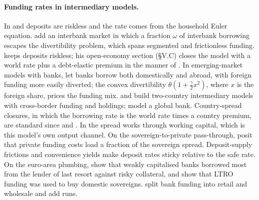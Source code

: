 \documentclass[11pt]{article}
\begin{document}
\paragraph{Funding rates in intermediary models.} In \citet{gertler2011model} and
\citet{gertler2010financial} deposits are riskless and the rate comes from the household Euler
equation. \citet{gertler2010financial} add an interbank market in which a fraction $\omega$ of
interbank borrowing escapes the divertibility problem, which spans segmented and frictionless
funding. \citet{bocola2016} keeps deposits riskless; his open-economy section (§V.C) closes the
model with a world rate plus a debt-elastic premium in the manner of
\citet{schmittgrohe2003closing}. In emerging-market models with banks,
\citet{aoki2016monetary} let banks borrow both domestically and abroad, with foreign funding more
easily diverted; the convex divertibility $\theta(1+\tfrac{\gamma}{2}x^2)$, where $x$ is the
foreign share, prices the funding mix. \citet{akinci2018exchange} and
\citet{dedola2013global} build two-country intermediary models with cross-border funding and
holdings; \citet{kollmann2011global} model a global bank. Country-spread closures, in which the
borrowing rate is the world rate times a country premium, are standard since
\citet{neumeyer2005business} and \citet{uribe2006country}. In \citet{neumeyer2005business} the
spread works through working capital, which is this model's own output channel. On the
sovereign-to-private pass-through, \citet{corsetti2013sovereign} posit that private funding
costs load a fraction of the sovereign spread. Deposit-supply frictions and convenience yields
\citep{drechsler2017deposits,begenau2020capital} make deposit rates sticky relative to the
safe rate. On the euro-area plumbing, \citet{drechsler2016who} show that weakly capitalised
banks borrowed most from the lender of last resort against risky collateral, and
\citet{crosignani2020unintended} show that LTRO funding was used to buy domestic sovereigns.
\citet{gertler2016wholesale} split bank funding into retail and wholesale and add runs.
\end{document}
